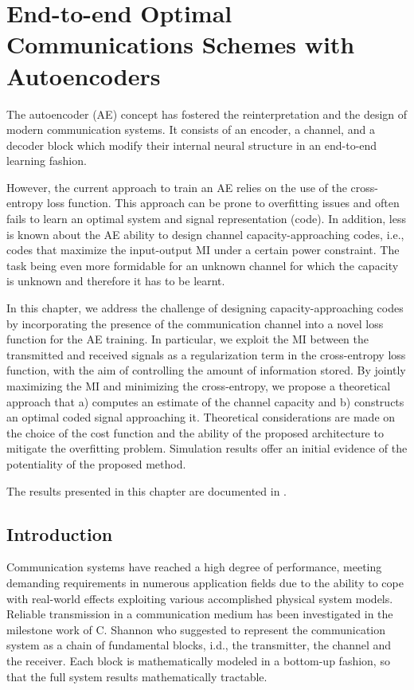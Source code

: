 \chapter{End-to-end Optimal Communications Schemes with Autoencoders} %
\label{sec:autoencoders}
The autoencoder (AE) concept has fostered the reinterpretation and the design of modern communication systems. It consists of an encoder, a channel, and a decoder block which modify their internal neural structure in an end-to-end learning fashion.

However, the current approach to train an AE relies on the use of the cross-entropy loss function. This approach can be prone to overfitting issues and often fails to learn an optimal system and signal representation (code). In addition, less is known about the AE ability to design channel capacity-approaching codes, i.e., codes that maximize the input-output MI under a certain power constraint. The task being even more formidable for an unknown channel for which the capacity is unknown and therefore it has to be learnt. 

In this chapter, we address the challenge of designing capacity-approaching codes by incorporating the presence of the communication channel into a novel loss function for the AE training. In particular, we exploit the MI between the transmitted and received signals as a regularization term in the cross-entropy loss function, with the aim of controlling the amount of information stored. By jointly maximizing the MI and minimizing the cross-entropy, we propose a theoretical approach that a) computes an estimate of the channel capacity and b) constructs an optimal coded signal approaching it. 
Theoretical considerations are made on the choice of the cost function and the ability of the proposed architecture to mitigate the overfitting problem.
Simulation results offer an initial evidence of the potentiality of the proposed method.

The results presented in this chapter are documented in \cite{Letizia2021}.

\section{Introduction}
\label{sec:autoencoders_related}

Communication systems have reached a high degree of performance, meeting demanding requirements in numerous application fields due to the ability to cope with real-world effects exploiting various accomplished physical system models. Reliable transmission in a communication medium has been investigated in the milestone work of C. Shannon \cite{Shannon1948} who suggested to represent the communication system as a chain of fundamental blocks, i.d., the transmitter, the channel and the receiver. Each block is mathematically modeled in a bottom-up fashion, so that the full system results mathematically tractable. 

